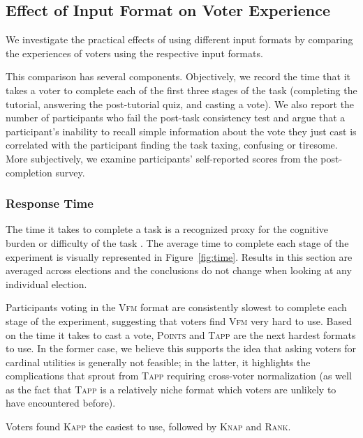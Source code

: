 \documentclass[twoside,11pt]{article}
\newcommand{\kibitz}[2]{\ifnum\Comments=1{\color{#1}{#2}}\fi}
\newcommand{\gb}[1]{\kibitz{red}{[GB:#1]}}
\newcommand{\points}{\textsc{Points}}
\newcommand{\rank}{\textsc{Rank}}
\newcommand{\vfm}{\textsc{Vfm}}
\newcommand{\knap}{\textsc{Knap}}
\newcommand{\kapp}{\textsc{Kapp}}
\newcommand{\tapp}{\textsc{Tapp}}
\begin{document}
 

\subsection{Effect of Input Format on Voter Experience} 

 
We investigate the practical effects of using different input formats by comparing  the experiences of voters using the respective input formats.

This comparison has several components. Objectively, we record the time that it takes a voter to complete each of the first three stages of the task (completing the tutorial, answering the post-tutorial quiz, and casting a vote).  
We also report the number  of participants who fail the post-task consistency test and argue that a participant's inability  to recall simple information about the vote they just cast is correlated with the participant finding the task taxing, confusing or tiresome. 
More subjectively, we examine participants' self-reported scores from the post-completion survey.  

\subsubsection{Response Time}
The time it takes to complete a task is a recognized  proxy for  the cognitive burden  or difficulty of the task  \cite{rauterberg1992method}.  
%
The average time to complete each stage of the experiment is visually represented in  Figure~\ref{fig:time}.  Results in this section are averaged across elections and the conclusions do not change when looking at any individual election. %

Participants voting in  the \vfm{}   format are consistently slowest to complete each stage of the experiment, suggesting that voters find \vfm{}  very hard to use. Based on the time it takes to cast a vote,  \points{} and \tapp{} are the next hardest formats to use. In the former case, we believe this supports the idea that asking voters for cardinal utilities is generally not feasible; in the latter, it  highlights the complications that sprout from  \tapp{} requiring cross-voter normalization  (as well as the fact that \tapp{} is a relatively niche format which voters are unlikely to have encountered before).  

Voters found \kapp{} the easiest to use, followed by \knap{} and \rank{}.
\end{document}
